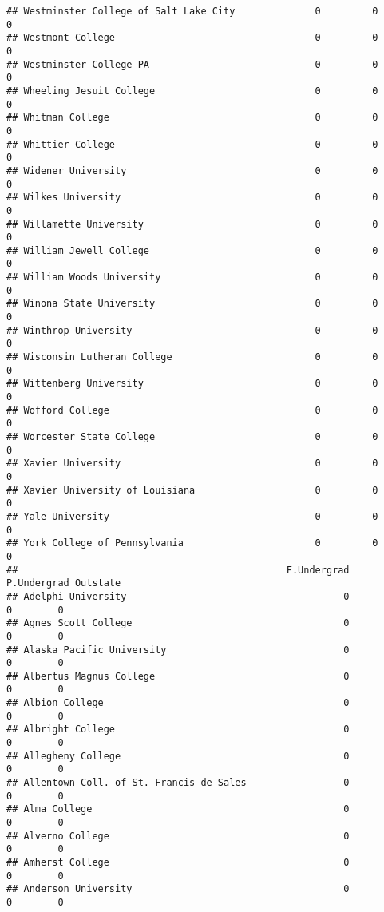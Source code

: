 \documentclass[
]{article}
\begin{document}
\begin{verbatim}
## Westminster College of Salt Lake City              0         0         0
## Westmont College                                   0         0         0
## Westminster College PA                             0         0         0
## Wheeling Jesuit College                            0         0         0
## Whitman College                                    0         0         0
## Whittier College                                   0         0         0
## Widener University                                 0         0         0
## Wilkes University                                  0         0         0
## Willamette University                              0         0         0
## William Jewell College                             0         0         0
## William Woods University                           0         0         0
## Winona State University                            0         0         0
## Winthrop University                                0         0         0
## Wisconsin Lutheran College                         0         0         0
## Wittenberg University                              0         0         0
## Wofford College                                    0         0         0
## Worcester State College                            0         0         0
## Xavier University                                  0         0         0
## Xavier University of Louisiana                     0         0         0
## Yale University                                    0         0         0
## York College of Pennsylvania                       0         0         0
##                                               F.Undergrad P.Undergrad Outstate
## Adelphi University                                      0           0        0
## Agnes Scott College                                     0           0        0
## Alaska Pacific University                               0           0        0
## Albertus Magnus College                                 0           0        0
## Albion College                                          0           0        0
## Albright College                                        0           0        0
## Allegheny College                                       0           0        0
## Allentown Coll. of St. Francis de Sales                 0           0        0
## Alma College                                            0           0        0
## Alverno College                                         0           0        0
## Amherst College                                         0           0        0
## Anderson University                                     0           0        0

\end{verbatim}
\end{document}
